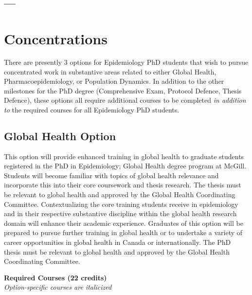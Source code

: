 \documentclass[
]{book}
\begin{document}
\hypertarget{section-2}{%
\section{---}\label{section-2}}

\hypertarget{concentrations}{%
\chapter{Concentrations}\label{concentrations}}

There are presently 3 options for Epidemiology PhD students that wish to pursue concentrated work in substantive areas related to either Global Health, Pharmacoepidemiology, or Population Dynamics. In addition to the other milestones for the PhD degree (Comprehensive Exam, Protocol Defence, Thesis Defence), these options all require additional courses to be completed \emph{in addition to} the required courses for all Epidemiology PhD students.

\hypertarget{global-health-option}{%
\section{Global Health Option}\label{global-health-option}}

This option will provide enhanced training in global health to graduate students registered in the PhD in Epidemiology; Global Health degree program at McGill. Students will become familiar with topics of global health relevance and incorporate this into their core coursework and thesis research. The thesis must be relevant to global health and approved by the Global Health Coordinating Committee. Contextualizing the core training students receive in epidemiology and in their respective substantive discipline within the global health research domain will enhance their academic experience. Graduates of this option will be prepared to pursue further training in global health or to undertake a variety of career opportunities in global health in Canada or internationally. The PhD thesis must be relevant to global health and approved by the Global Health Coordinating Committee.

\textbf{Required Courses (22 credits)}\\
\emph{Option-specific courses are italicized}
\end{document}
